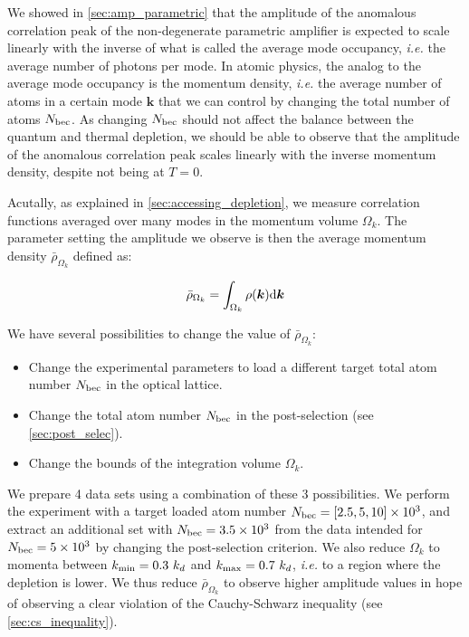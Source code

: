 We showed in \ref{sec:amp_parametric} that the amplitude of the anomalous correlation peak of the non-degenerate parametric amplifier is expected to scale linearly with the inverse of what is called the average mode occupancy, {\it i.e.} the average number of photons per mode. In atomic physics, the analog to the average mode occupancy is the momentum density, {\it i.e.} the average number of atoms in a certain mode $\bm{k}$ that we can control by changing the total number of atoms $N_{\rm{bec}}$. As changing $N_{\rm{bec}}$ should not affect the balance between the quantum and thermal depletion, we should be able to observe that the amplitude of the anomalous correlation peak scales linearly with the inverse momentum density, despite not being at $T=0$.

Acutally, as explained in \ref{sec:accessing_depletion}, we measure correlation functions averaged over many modes in the momentum volume $\Omega_k$. The parameter setting the amplitude we observe is then the average momentum density $\bar{\rho}_{\Omega_k}$ defined as:

\begin{equation}
    \bar{\rho}_{\Omega_k}=\int_{\Omega_{k}} \rho({\bm k}) {\rm d}{\bm k}
\end{equation}

We have several possibilities to change the value of $\bar{\rho}_{\Omega_k}$:

\begin{itemize}
    \item Change the experimental parameters to load a different target total atom number $N_{\rm{bec}}$ in the optical lattice.
    \item Change the total atom number $N_{\rm{bec}}$ in the post-selection (see \ref{sec:post_selec}).
    \item Change the bounds of the integration volume $\Omega_k$.
\end{itemize}

We prepare 4 data sets using a combination of these 3 possibilities. We perform the experiment with a target loaded atom number $N_{\rm{bec}}=[2.5,5,10] \times 10^3$, and extract an additional set with $N_{\rm{bec}}=3.5 \times 10^3$ from the data intended for $N_{\rm{bec}} = 5 \times 10^3$ by changing the post-selection criterion. We also reduce $\Omega_k$ to momenta between $k_{\rm{min}} = 0.3 \ k_d$ and $k_{\rm{max}} = 0.7 \ k_d$, {\it i.e.} to a region where the depletion is lower. We thus reduce $\bar{\rho}_{\Omega_k}$ to observe higher amplitude values in hope of observing a clear violation of the Cauchy-Schwarz inequality (see \ref{sec:cs_inequality}).

